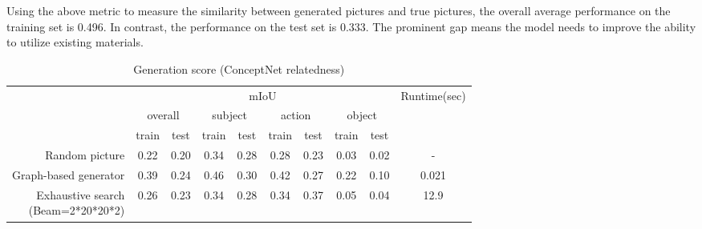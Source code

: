 \documentclass{article} %
\begin{document}
Using the above metric to measure the similarity between generated pictures and true pictures, the overall average performance on the training set is 0.496. In contrast, the performance on the test set is 0.333. The prominent gap means the model needs to improve the ability to utilize existing materials.


\begin{table}[htbp]
	\caption{Generation score (ConceptNet relatedness)}
	\centering
	\begin{tabular}{rccccccccc}
		\toprule
				 & \multicolumn{8}{c}{mIoU} & \multirow{3}{*}{Runtime(sec)}\\
		\cmidrule{2-9}
				 & \multicolumn{2}{c}{overall} & \multicolumn{2}{c}{subject} & \multicolumn{2}{c}{action} & \multicolumn{2}{c}{object} & \\
		\cmidrule{2-3}\cmidrule{4-5}\cmidrule{6-7}\cmidrule{8-9}
				 & train &  test &  train &  test &  train &  test &  train &  test & \\
		\midrule
		Random picture
				& 0.22 & 0.20 & 	0.34		& 	0.28	  & 	0.28	  & 	0.23	 &  0.03		  & 	0.02	&  - \\
		Graph-based generator
				& 0.39 & 0.24 & 	0.46 & 	 0.30 & 	0.42	  & 	0.27  & 	0.22	  & 0.10 	&  0.021  \\
				\makecell{Exhaustive search\\(Beam=2*20*20*2)}
				& 0.26 & 0.23 & 0.34 & 0.28 & 0.34 & 0.37 & 0.05 & 0.04 & 12.9\\
		\bottomrule
	\end{tabular}%
	\label{tab: feat}
\end{table}
\end{document}
